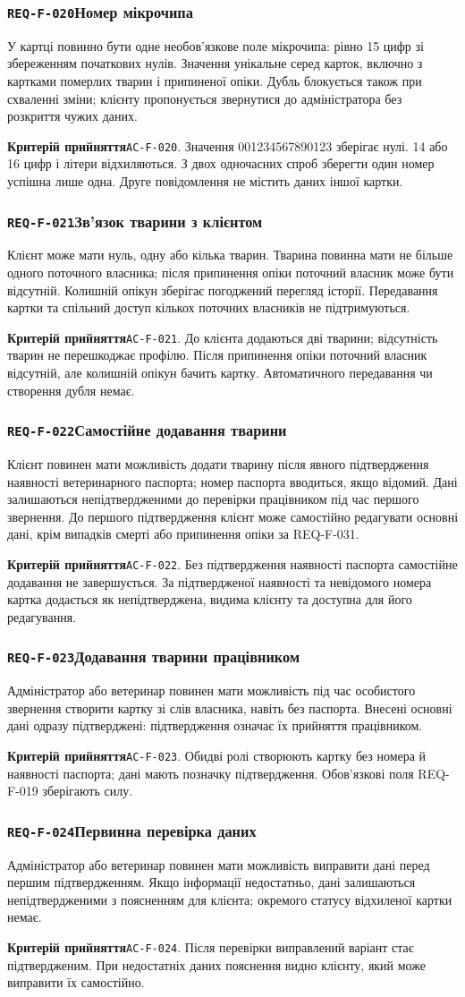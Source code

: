 \documentclass[11pt,a4paper]{article}
\newcommand{\requirement}[4]{%
  \Needspace{7\baselineskip}%
  \subsubsection*{\hypertarget{#1}{\texttt{#1}}\quad #2}%
  #3\par
  \textbf{Критерій прийняття}\quad #4\par\medskip}
\begin{document}
\requirement{REQ-F-020}{Номер мікрочипа}{У картці повинно бути одне необов’язкове поле мікрочипа: рівно 15 цифр зі збереженням початкових нулів. Значення унікальне серед карток, включно з картками померлих тварин і припиненої опіки. Дубль блокується також при схваленні зміни; клієнту пропонується звернутися до адміністратора без розкриття чужих даних.}{\hypertarget{AC-F-020}{\texttt{AC-F-020}}. Значення 001234567890123 зберігає нулі. 14 або 16 цифр і літери відхиляються. З двох одночасних спроб зберегти один номер успішна лише одна. Друге повідомлення не містить даних іншої картки.}

\requirement{REQ-F-021}{Зв’язок тварини з клієнтом}{Клієнт може мати нуль, одну або кілька тварин. Тварина повинна мати не більше одного поточного власника; після припинення опіки поточний власник може бути відсутній. Колишній опікун зберігає погоджений перегляд історії. Передавання картки та спільний доступ кількох поточних власників не підтримуються.}{\hypertarget{AC-F-021}{\texttt{AC-F-021}}. До клієнта додаються дві тварини; відсутність тварин не перешкоджає профілю. Після припинення опіки поточний власник відсутній, але колишній опікун бачить картку. Автоматичного передавання чи створення дубля немає.}

\requirement{REQ-F-022}{Самостійне додавання тварини}{Клієнт повинен мати можливість додати тварину після явного підтвердження наявності ветеринарного паспорта; номер паспорта вводиться, якщо відомий. Дані залишаються непідтвердженими до перевірки працівником під час першого звернення. До першого підтвердження клієнт може самостійно редагувати основні дані, крім випадків смерті або припинення опіки за REQ-F-031.}{\hypertarget{AC-F-022}{\texttt{AC-F-022}}. Без підтвердження наявності паспорта самостійне додавання не завершується. За підтвердженої наявності та невідомого номера картка додається як непідтверджена, видима клієнту та доступна для його редагування.}

\requirement{REQ-F-023}{Додавання тварини працівником}{Адміністратор або ветеринар повинен мати можливість під час особистого звернення створити картку зі слів власника, навіть без паспорта. Внесені основні дані одразу підтверджені: підтвердження означає їх прийняття працівником.}{\hypertarget{AC-F-023}{\texttt{AC-F-023}}. Обидві ролі створюють картку без номера й наявності паспорта; дані мають позначку підтвердження. Обов’язкові поля REQ-F-019 зберігають силу.}

\requirement{REQ-F-024}{Первинна перевірка даних}{Адміністратор або ветеринар повинен мати можливість виправити дані перед першим підтвердженням. Якщо інформації недостатньо, дані залишаються непідтвердженими з поясненням для клієнта; окремого статусу відхиленої картки немає.}{\hypertarget{AC-F-024}{\texttt{AC-F-024}}. Після перевірки виправлений варіант стає підтвердженим. При недостатніх даних пояснення видно клієнту, який може виправити їх самостійно.}
\end{document}
